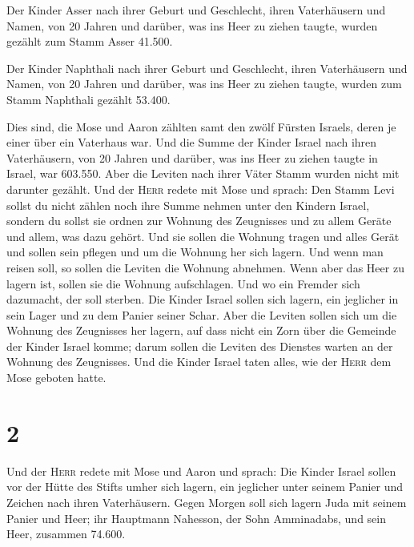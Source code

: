  Der Kinder Asser nach ihrer Geburt und Geschlecht, ihren
Vaterhäusern und Namen, von 20 Jahren und darüber, was ins Heer zu
ziehen taugte,  wurden gezählt zum Stamm Asser 41.500.

 Der Kinder Naphthali nach ihrer Geburt und Geschlecht,
ihren Vaterhäusern und Namen, von 20 Jahren und darüber, was ins Heer zu
ziehen taugte,  wurden zum Stamm Naphthali gezählt
53.400.

 Dies sind, die Mose und Aaron zählten samt den zwölf
Fürsten Israels, deren je einer über ein Vaterhaus war. 
Und die Summe der Kinder Israel nach ihren Vaterhäusern, von 20 Jahren
und darüber, was ins Heer zu ziehen taugte in Israel, 
war 603.550.  Aber die Leviten nach ihrer Väter Stamm
wurden nicht mit darunter gezählt.  Und der \textsc{Herr}
redete mit Mose und sprach:  Den Stamm Levi sollst du
nicht zählen noch ihre Summe nehmen unter den Kindern Israel,
 sondern du sollst sie ordnen zur Wohnung des Zeugnisses
und zu allem Geräte und allem, was dazu gehört. Und sie sollen die
Wohnung tragen und alles Gerät und sollen sein pflegen und um die
Wohnung her sich lagern.  Und wenn man reisen soll, so
sollen die Leviten die Wohnung abnehmen. Wenn aber das Heer zu lagern
ist, sollen sie die Wohnung aufschlagen. Und wo ein Fremder sich
dazumacht, der soll sterben.  Die Kinder Israel sollen
sich lagern, ein jeglicher in sein Lager und zu dem Panier seiner Schar.
 Aber die Leviten sollen sich um die Wohnung des
Zeugnisses her lagern, auf dass nicht ein Zorn über die Gemeinde der
Kinder Israel komme; darum sollen die Leviten des Dienstes warten an der
Wohnung des Zeugnisses.  Und die Kinder Israel taten
alles, wie der \textsc{Herr} dem Mose geboten hatte.

\hypertarget{section-1}{%
\section{2}\label{section-1}}

 Und der \textsc{Herr} redete mit Mose und Aaron und
sprach:  Die Kinder Israel sollen vor der Hütte des Stifts
umher sich lagern, ein jeglicher unter seinem Panier und Zeichen nach
ihren Vaterhäusern.  Gegen Morgen soll sich lagern Juda
mit seinem Panier und Heer; ihr Hauptmann Nahesson, der Sohn Amminadabs,
 und sein Heer, zusammen 74.600.

